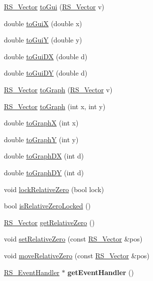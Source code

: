 \begin{DoxyCompactItemize}
\item 
\hyperlink{classRS__Vector}{R\-S\-\_\-\-Vector} \hyperlink{classRS__GraphicView_a6e213479314ef93667e757fa3223ee18}{to\-Gui} (\hyperlink{classRS__Vector}{R\-S\-\_\-\-Vector} v)
\item 
double \hyperlink{classRS__GraphicView_ad5aaa0d28de23d84775e2ceb44dc6ccb}{to\-Gui\-X} (double x)
\item 
double \hyperlink{classRS__GraphicView_aa3a2948c59ed17711b4e404c4c538ca2}{to\-Gui\-Y} (double y)
\item 
double \hyperlink{classRS__GraphicView_a7abc7f543e66d20b9510e0618215c4e3}{to\-Gui\-D\-X} (double d)
\item 
double \hyperlink{classRS__GraphicView_af653db7ecbc79b143a0a5c365ab34fcd}{to\-Gui\-D\-Y} (double d)
\item 
\hyperlink{classRS__Vector}{R\-S\-\_\-\-Vector} \hyperlink{classRS__GraphicView_af2d22f87b620d4d3693c3711ba8fa416}{to\-Graph} (\hyperlink{classRS__Vector}{R\-S\-\_\-\-Vector} v)
\item 
\hyperlink{classRS__Vector}{R\-S\-\_\-\-Vector} \hyperlink{classRS__GraphicView_a8333b5366b60e6b0044f22756463aecb}{to\-Graph} (int x, int y)
\item 
double \hyperlink{classRS__GraphicView_a075ac6bc53bb8db737c9d1f682278c9f}{to\-Graph\-X} (int x)
\item 
double \hyperlink{classRS__GraphicView_a1fc38b392630cc1e81951aeb360bfa2b}{to\-Graph\-Y} (int y)
\item 
double \hyperlink{classRS__GraphicView_a17d534219f89bf68ceaadec7acccd74a}{to\-Graph\-D\-X} (int d)
\item 
double \hyperlink{classRS__GraphicView_a36d298435d8f3e1ee3109c3b15f9fb38}{to\-Graph\-D\-Y} (int d)
\item 
void \hyperlink{classRS__GraphicView_ab8d7caac7287cde6aa1c78fa7e0ece16}{lock\-Relative\-Zero} (bool lock)
\item 
bool \hyperlink{classRS__GraphicView_aa03e4e2fdef56884424d660f32dd9462}{is\-Relative\-Zero\-Locked} ()
\item 
\hyperlink{classRS__Vector}{R\-S\-\_\-\-Vector} \hyperlink{classRS__GraphicView_a8450070ec5d7900e5a75dd4f41a82e59}{get\-Relative\-Zero} ()
\item 
void \hyperlink{classRS__GraphicView_ac1ca0a162ed21b698d76ec51d6c59a73}{set\-Relative\-Zero} (const \hyperlink{classRS__Vector}{R\-S\-\_\-\-Vector} \&pos)
\item 
void \hyperlink{classRS__GraphicView_a9d5dc1f5a3cee80ed4cc40aa57434ef1}{move\-Relative\-Zero} (const \hyperlink{classRS__Vector}{R\-S\-\_\-\-Vector} \&pos)
\item 
\hypertarget{classRS__GraphicView_a740c78b1d5991fd03ec370b2bfdf4d41}{\hyperlink{classRS__EventHandler}{R\-S\-\_\-\-Event\-Handler} $\ast$ {\bfseries get\-Event\-Handler} ()}\label{classRS__GraphicView_a740c78b1d5991fd03ec370b2bfdf4d41}


\end{DoxyCompactItemize}
